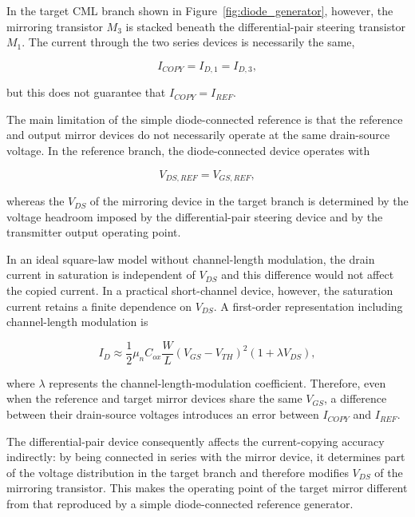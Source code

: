 In the target \ac{CML} branch shown in Figure~\ref{fig:diode_generator}, however, the mirroring transistor $M_3$ is stacked beneath the differential-pair steering transistor $M_1$. The current through the two series devices is necessarily the same,

\begin{equation}
    I_{COPY}=I_{D,1}=I_{D,3},
\end{equation}

but this does not guarantee that $I_{COPY}=I_{REF}$.

The main limitation of the simple diode-connected reference is that the reference and output mirror devices do not necessarily operate at the same drain-source voltage. In the reference branch, the diode-connected device operates with

\begin{equation}
    V_{DS,REF}=V_{GS,REF},
\end{equation}

whereas the $V_{DS}$ of the mirroring device in the target branch is determined by the voltage headroom imposed by the differential-pair steering device and by the transmitter output operating point.

In an ideal square-law model without channel-length modulation, the drain current in saturation is independent of $V_{DS}$ and this difference would not affect the copied current. In a practical short-channel device, however, the saturation current retains a finite dependence on $V_{DS}$. A first-order representation including channel-length modulation is

\begin{equation}\label{eq:id_clm}
    I_D \approx
    \frac{1}{2}\mu_n C_{ox}\frac{W}{L}
    \left(V_{GS}-V_{TH}\right)^2
    \left(1+\lambda V_{DS}\right),
\end{equation}

where $\lambda$ represents the channel-length-modulation coefficient. Therefore, even when the reference and target mirror devices share the same $V_{GS}$, a difference between their drain-source voltages introduces an error between $I_{COPY}$ and $I_{REF}$.

The differential-pair device consequently affects the current-copying accuracy indirectly: by being connected in series with the mirror device, it determines part of the voltage distribution in the target branch and therefore modifies $V_{DS}$ of the mirroring transistor. This makes the operating point of the target mirror different from that reproduced by a simple diode-connected reference generator.

